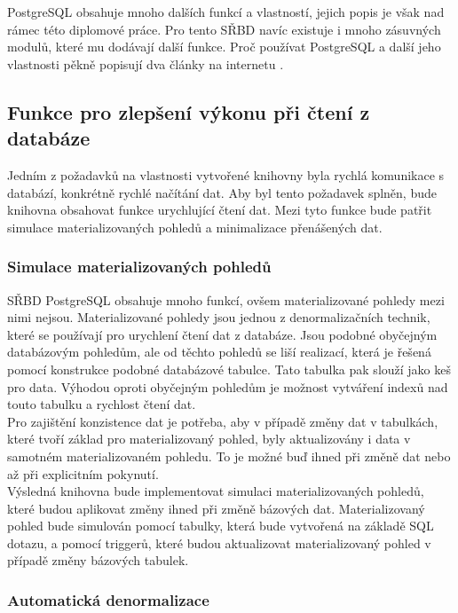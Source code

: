 \documentclass[ing,male,java,dept456]{diploma}						%
\begin{document}
PostgreSQL obsahuje mnoho dalších funkcí a vlastností, jejich popis je však nad rámec této diplomové práce. Pro tento SŘBD navíc existuje i mnoho zásuvných modulů, které mu dodávají další funkce. Proč používat PostgreSQL a další jeho vlastnosti pěkně popisují dva články na internetu \cite{postgre, postgre2}.

\subsection{Funkce pro zlepšení výkonu při čtení z databáze}
\label{subsec:ReadOpt}

Jedním z požadavků na vlastnosti vytvořené knihovny byla rychlá komunikace s databází, konkrétně rychlé načítání dat. Aby byl tento požadavek splněn, bude knihovna obsahovat funkce urychlující čtení dat. Mezi tyto funkce bude patřit simulace materializovaných pohledů a minimalizace přenášených dat.

\subsubsection{Simulace materializovaných pohledů}

SŘBD PostgreSQL obsahuje mnoho funkcí, ovšem materializované pohledy mezi nimi nejsou. Materializované pohledy jsou jednou z denormalizačních technik, které se používají pro urychlení čtení dat z databáze. Jsou podobné obyčejným databázovým pohledům, ale od těchto pohledů se liší realizací, která je řešená pomocí konstrukce podobné databázové tabulce. Tato tabulka pak slouží jako keš pro data. Výhodou oproti obyčejným pohledům je možnost vytváření indexů nad touto tabulku a rychlost čtení dat. \\
Pro zajištění konzistence dat je potřeba, aby v případě změny dat v tabulkách, které tvoří základ pro materializovaný pohled, byly aktualizovány i data v samotném materializovaném pohledu. To je možné buď ihned při změně dat nebo až při explicitním pokynutí. \\

Výsledná knihovna bude implementovat simulaci materializovaných pohledů, které budou aplikovat změny ihned při změně bázových dat. Materializovaný pohled bude simulován pomocí tabulky, která bude vytvořená na základě SQL dotazu, a pomocí triggerů, které budou aktualizovat materializovaný pohled v případě změny bázových tabulek. \\

\subsubsection{Automatická denormalizace}
\end{document}
